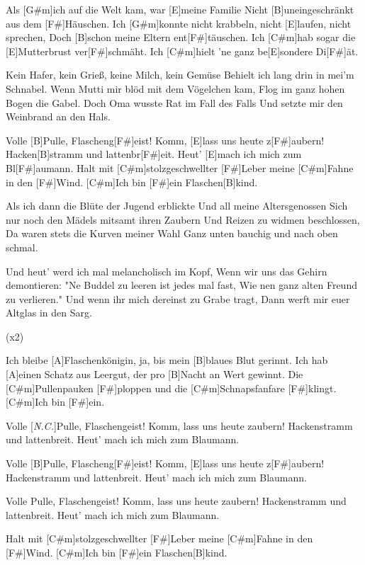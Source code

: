 

\begin{guitar}
	Als [G#m]ich auf die Welt kam, war [E]meine Familie
	Nicht [B]uneingeschränkt aus dem [F#]Häuschen.
	Ich [G#m]konnte nicht krabbeln, nicht [E]laufen, nicht sprechen,
	Doch [B]schon meine Eltern ent[F#]täuschen.
	Ich [C#m]hab sogar die [E]Mutterbrust ver[F#]schmäht.
	Ich [C#m]hielt 'ne ganz be[E]sondere Di[F#]{ä}t.
	
	Kein Hafer, kein Grieß, keine Milch, kein Gemüse
	Behielt ich lang drin in mei'm Schnabel.
	Wenn Mutti mir blöd mit dem Vögelchen kam,
	Flog im ganz hohen Bogen die Gabel.
	Doch Oma wusste Rat im Fall des Falls
	Und setzte mir den Weinbrand an den Hals.
	
	Volle [B]Pulle, Flascheng[F#]eist! Komm, [E]lass uns heute z[F#]aubern!
	Hacken[B]stramm und lattenbr[F#]eit. Heut' [E]mach ich mich zum Bl[F#]aumann.
	Halt mit [C#m]stolzgeschwellter [F#]Leber meine [C#m]Fahne in den [F#]Wind.
	[C#m]Ich bin [F#]ein Flaschen[B]kind.
	
	Als ich dann die Blüte der Jugend erblickte
	Und all meine Altersgenossen
	Sich nur noch den Mädels mitsamt ihren Zaubern
	Und Reizen zu widmen beschlossen,
	Da waren stets die Kurven meiner Wahl
	Ganz unten bauchig und nach oben schmal.
	
	Und heut' werd ich mal melancholisch im Kopf,
	Wenn wir uns das Gehirn demontieren:
	"Ne Buddel zu leeren ist jedes mal fast,
	Wie nen ganz alten Freund zu verlieren."
	Und wenn ihr mich dereinst zu Grabe tragt,
	Dann werft mir euer Altglas in den Sarg.
	
	  (x2)
	
	Ich bleibe [A]Flaschenkönigin, ja, bis mein [B]blaues Blut gerinnt.
	Ich hab [A]einen Schatz aus Leergut, der pro [B]Nacht an Wert gewinnt.
	Die [C#m]Pullenpauken [F#]ploppen und die [C#m]Schnapsfanfare [F#]klingt.
	[C#m]Ich bin [F#]ein.
	
	Volle [\textit{N.C.}]Pulle, Flaschengeist! Komm, lass uns heute zaubern!
	Hackenstramm und lattenbreit. Heut' mach ich mich zum Blaumann.
	
	Volle [B]Pulle, Flascheng[F#]eist! Komm, [E]lass uns heute z[F#]aubern!
	Hackenstramm und lattenbreit. Heut' mach ich mich zum Blaumann.

	Volle Pulle, Flaschengeist! Komm, lass uns heute zaubern!
	Hackenstramm und lattenbreit. Heut' mach ich mich zum Blaumann.
	
	Halt mit [C#m]stolzgeschwellter [F#]Leber meine [C#m]Fahne in den [F#]Wind.
	[C#m]Ich bin [F#]ein Flaschen[B]kind.
	
\end{guitar}